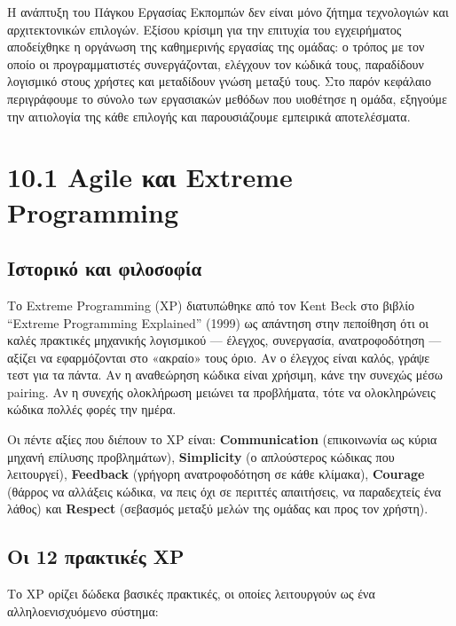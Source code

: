 \documentclass[11pt,a4paper,greek,twoside]{template-xe}
\begin{document}
Η ανάπτυξη του Πάγκου Εργασίας Εκπομπών δεν είναι μόνο ζήτημα
τεχνολογιών και αρχιτεκτονικών επιλογών. Εξίσου κρίσιμη για την επιτυχία
του εγχειρήματος αποδείχθηκε η οργάνωση της καθημερινής εργασίας της
ομάδας: ο τρόπος με τον οποίο οι προγραμματιστές συνεργάζονται, ελέγχουν
τον κώδικά τους, παραδίδουν λογισμικό στους χρήστες και μεταδίδουν γνώση
μεταξύ τους. Στο παρόν κεφάλαιο περιγράφουμε το σύνολο των εργασιακών
μεθόδων που υιοθέτησε η ομάδα, εξηγούμε την αιτιολογία της κάθε επιλογής
και παρουσιάζουμε εμπειρικά αποτελέσματα.

\section{10.1 Agile και Extreme
Programming}\label{agile-ux3baux3b1ux3b9-extreme-programming}

\subsection{Ιστορικό και
φιλοσοφία}\label{ux3b9ux3c3ux3c4ux3bfux3c1ux3b9ux3baux3cc-ux3baux3b1ux3b9-ux3c6ux3b9ux3bbux3bfux3c3ux3bfux3c6ux3afux3b1}

Το Extreme Programming (XP) διατυπώθηκε από τον Kent Beck στο βιβλίο
``Extreme Programming Explained'' (1999) ως απάντηση στην πεποίθηση ότι
οι καλές πρακτικές μηχανικής λογισμικού --- έλεγχος, συνεργασία,
ανατροφοδότηση --- αξίζει να εφαρμόζονται στο «ακραίο» τους όριο. Αν ο
έλεγχος είναι καλός, γράψε τεστ για τα πάντα. Αν η αναθεώρηση κώδικα
είναι χρήσιμη, κάνε την συνεχώς μέσω pairing. Αν η συνεχής ολοκλήρωση
μειώνει τα προβλήματα, τότε να ολοκληρώνεις κώδικα πολλές φορές την
ημέρα.

Οι πέντε αξίες που διέπουν το XP είναι: \textbf{Communication}
(επικοινωνία ως κύρια μηχανή επίλυσης προβλημάτων), \textbf{Simplicity}
(ο απλούστερος κώδικας που λειτουργεί), \textbf{Feedback} (γρήγορη
ανατροφοδότηση σε κάθε κλίμακα), \textbf{Courage} (θάρρος να αλλάξεις
κώδικα, να πεις όχι σε περιττές απαιτήσεις, να παραδεχτείς ένα λάθος)
και \textbf{Respect} (σεβασμός μεταξύ μελών της ομάδας και προς τον
χρήστη).

\subsection{Οι 12 πρακτικές
XP}\label{ux3bfux3b9-12-ux3c0ux3c1ux3b1ux3baux3c4ux3b9ux3baux3adux3c2-xp}

Το XP ορίζει δώδεκα βασικές πρακτικές, οι οποίες λειτουργούν ως ένα
αλληλοενισχυόμενο σύστημα:
\end{document}
